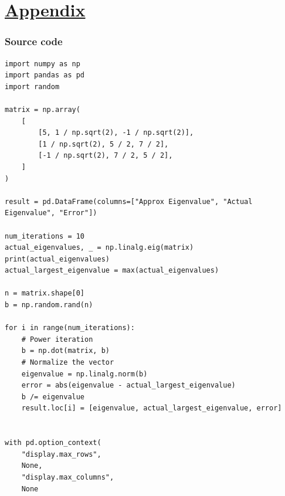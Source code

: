 \documentclass[12pt,
               a4paper,
               article,
               oneside,
               english,oldfontcommands]{memoir}
\begin{document}
\section*{\centering \underline{Appendix}}
\subsubsection*{\centering Source code}
\begin{lstlisting}[caption= Power Iteration, label={lst: power}]
import numpy as np
import pandas as pd
import random

matrix = np.array(
    [
        [5, 1 / np.sqrt(2), -1 / np.sqrt(2)],
        [1 / np.sqrt(2), 5 / 2, 7 / 2],
        [-1 / np.sqrt(2), 7 / 2, 5 / 2],
    ]
)

result = pd.DataFrame(columns=["Approx Eigenvalue", "Actual Eigenvalue", "Error"])

num_iterations = 10
actual_eigenvalues, _ = np.linalg.eig(matrix)
print(actual_eigenvalues)
actual_largest_eigenvalue = max(actual_eigenvalues)

n = matrix.shape[0]
b = np.random.rand(n)

for i in range(num_iterations):
    # Power iteration
    b = np.dot(matrix, b)
    # Normalize the vector
    eigenvalue = np.linalg.norm(b)
    error = abs(eigenvalue - actual_largest_eigenvalue)
    b /= eigenvalue
    result.loc[i] = [eigenvalue, actual_largest_eigenvalue, error]


with pd.option_context(
    "display.max_rows",
    None,
    "display.max_columns",
    None
\end{lstlisting}
\end{document}

